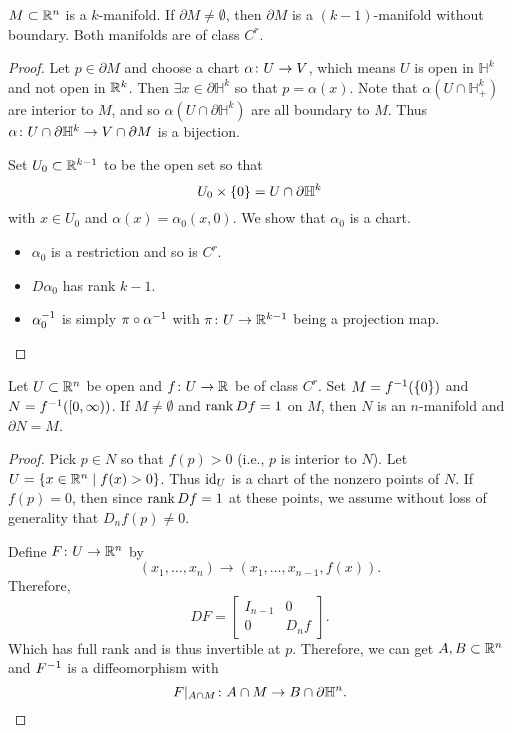 \documentclass{article}
\begin{document}
\begin{proposition}{}{}
  $M \subset \RR[n]$ is a $k$-manifold.
  If $\partial M \ne \emptyset$, then $\partial M$ is a $(k - 1)$-manifold
  without boundary. Both manifolds are of class $C^{r}$.
\end{proposition}
\begin{proof}
  Let $p \in \partial M$ and choose a chart $\alpha \from U \to V$, which means
  $U$ is open in $\mathbb{H}^{k}$ and not open in $\RR[k]$.
  Then $\exists x \in \partial\mathbb{H}^{k}$ so that $p = \alpha(x)$.
  Note that $\alpha(U \cap \mathbb{H}_{+}^{k})$ are interior to $M$,
  and so $\alpha(U \cap \partial \mathbb{H}^{k})$ are all boundary to $M$.
  Thus $\alpha\from U \cap \partial \mathbb{H}^{k} \to V \cap \partial M$ is a bijection.

  Set $U_{0} \subset \RR[k - 1]$ to be the open set so that
  \[ U_{0} \times \set{0} = U \cap \partial \mathbb{H}^{k} \]
  with $x \in U_{0}$ and $\alpha(x) = \alpha_{0}(x, 0)$.
  We show that $\alpha_{0}$ is a chart.
  \begin{itemize}
    \item $\alpha_{0}$ is a restriction and so is $C^{r}$.
    \item $D\alpha_{0}$ has rank $k - 1$.
    \item $\alpha_{0}\inv$ is simply $\pi \circ \alpha\inv$
          with $\pi \from U \to \RR[k - 1]$ being a projection map.\ \qedhere
  \end{itemize}
\end{proof}

\begin{theorem}{}{}
  Let $U \subset \RR[n]$ be open and $f \from U \to \RR$ be of class $C^{r}$.
  Set $M = f\inv(\set{0})$ and $N = f\inv(\lbrack0, \infty\rparen)$.
  If $M \ne \emptyset$ and $\rank Df = 1$ on $M$, then
  $N$ is an $n$-manifold and $\partial N = M$.
\end{theorem}
\begin{proof}
  Pick $p \in N$ so that $f(p) > 0$ (i.e., $p$ is interior to $N$).
  Let $U = \set{ x \in \RR[n] \mid f(x) > 0 }$.
  Thus $\id[U]$ is a chart of the nonzero points of $N$.
  If $f(p) = 0$, then since $\rank Df = 1$ at these points, we assume
  without loss of generality that $D_{n}f(p) \ne 0$.

  Define $F \from U \to \RR[n]$ by
  \[ (x_{1}, \ldots, x_{n}) \to (x_{1}, \ldots, x_{n - 1}, f(x)). \]
  Therefore,
  \[ DF = \begin{bmatrix} I_{n - 1} & 0\\
    0 & D_{n}f \end{bmatrix}. \]
  Which has full rank and is thus invertible at $p$.
  Therefore, we can get $A, B \subset \RR[n]$ and $F\inv$ is a diffeomorphism
  with
  \[ F|_{A \cap M} \from A \cap M \to B \cap \partial \mathbb{H}^{n}. \qedhere \]
\end{proof}
\end{document}
